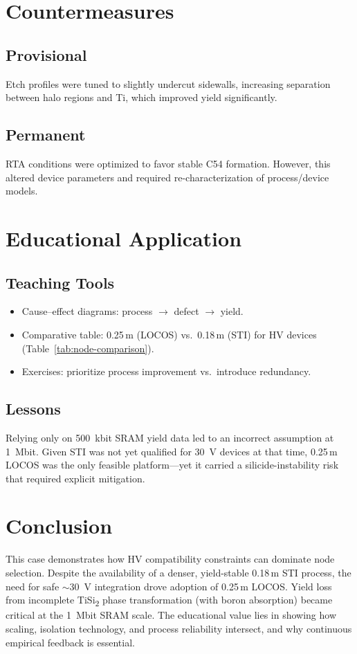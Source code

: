 \documentclass[conference]{IEEEtran}
\begin{document}
\section{Countermeasures}
\subsection{Provisional}
Etch profiles were tuned to slightly undercut sidewalls, increasing separation between halo regions and Ti, which improved yield significantly.

\subsection{Permanent}
RTA conditions were optimized to favor stable C54 formation.
However, this altered device parameters and required re-characterization of process/device models.

\section{Educational Application}
\subsection{Teaching Tools}
\begin{itemize}
  \item Cause–effect diagrams: process $\rightarrow$ defect $\rightarrow$ yield.
  \item Comparative table: 0.25\,\textmu m (LOCOS) vs.\ 0.18\,\textmu m (STI) for HV devices (Table~\ref{tab:node-comparison}).
  \item Exercises: prioritize process improvement vs.\ introduce redundancy.
\end{itemize}

\subsection{Lessons}
Relying only on 500~kbit SRAM yield data led to an incorrect assumption at 1~Mbit.
Given STI was not yet qualified for 30~V devices at that time, 0.25\,\textmu m LOCOS was the only feasible platform—yet it carried a silicide-instability risk that required explicit mitigation.

\section{Conclusion}
This case demonstrates how HV compatibility constraints can dominate node selection.
Despite the availability of a denser, yield-stable 0.18\,\textmu m STI process, the need for safe $\sim$30~V integration drove adoption of 0.25\,\textmu m LOCOS.
Yield loss from incomplete TiSi\textsubscript{2} phase transformation (with boron absorption) became critical at the 1~Mbit SRAM scale.
The educational value lies in showing how scaling, isolation technology, and process reliability intersect, and why continuous empirical feedback is essential.
\end{document}
